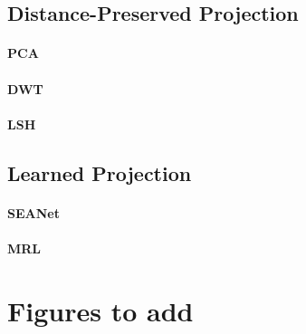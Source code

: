 \documentclass[sigconf]{acmart}
\begin{document}
\subsection{Distance-Preserved Projection}
\paragraph{PCA}

\paragraph{DWT}

\paragraph{LSH~\cite{pmlsh}}


\subsection{Learned Projection}
\paragraph{SEANet~\cite{seanet}}

\paragraph{MRL}


\section{Figures to add}






\end{document}
